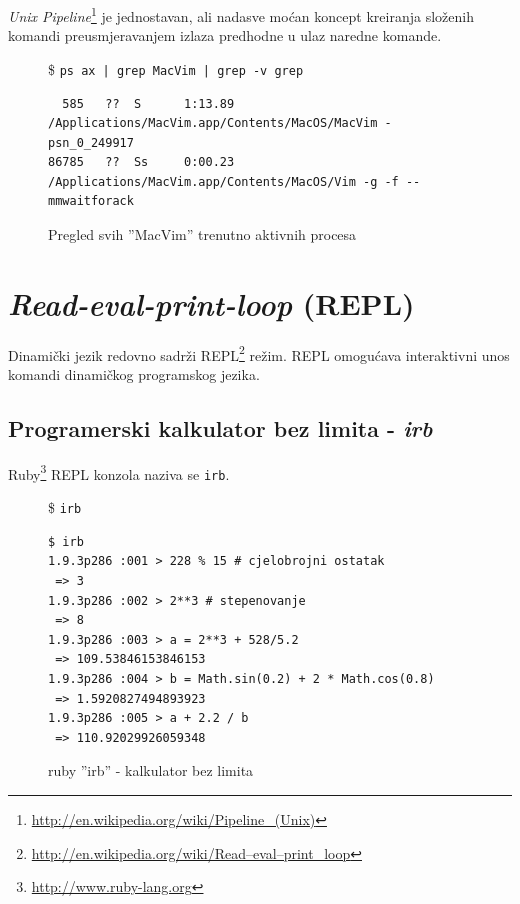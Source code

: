 \documentclass[times, utf8, seminar]{fit}
\begin{document}
\emph{Unix Pipeline}\footnote{\url{http://en.wikipedia.org/wiki/Pipeline_(Unix)}} je jednostavan, ali nadasve moćan koncept kreiranja složenih komandi preusmjeravanjem izlaza predhodne u ulaz naredne komande.

\begin{figure}[H]
\$ \verb+ps ax | grep MacVim | grep -v grep+
\begin{lstlisting}
  585   ??  S      1:13.89 /Applications/MacVim.app/Contents/MacOS/MacVim -psn_0_249917
86785   ??  Ss     0:00.23 /Applications/MacVim.app/Contents/MacOS/Vim -g -f --mmwaitforack
\end{lstlisting}

\caption{Pregled svih ''MacVim'' trenutno aktivnih procesa}
\end{figure}



\section{\emph{Read-eval-print-loop} (REPL)}

Dinamički jezik redovno sadrži REPL\footnote{\url{http://en.wikipedia.org/wiki/Read–eval–print_loop}} režim.
REPL omogućava interaktivni unos komandi dinamičkog programskog jezika.

\subsection{Programerski kalkulator bez limita - \emph{irb}}

Ruby\footnote{\url{http://www.ruby-lang.org}} REPL konzola naziva se \verb+irb+. 


\begin{figure}[H]
\$ \verb+irb+

\begin{lstlisting}
$ irb
1.9.3p286 :001 > 228 % 15 # cjelobrojni ostatak
 => 3 
1.9.3p286 :002 > 2**3 # stepenovanje
 => 8 
1.9.3p286 :003 > a = 2**3 + 528/5.2
 => 109.53846153846153 
1.9.3p286 :004 > b = Math.sin(0.2) + 2 * Math.cos(0.8)
 => 1.5920827494893923 
1.9.3p286 :005 > a + 2.2 / b
 => 110.92029926059348
\end{lstlisting}

\caption{ruby ''irb'' - kalkulator bez limita}
\end{figure}



\end{document}

